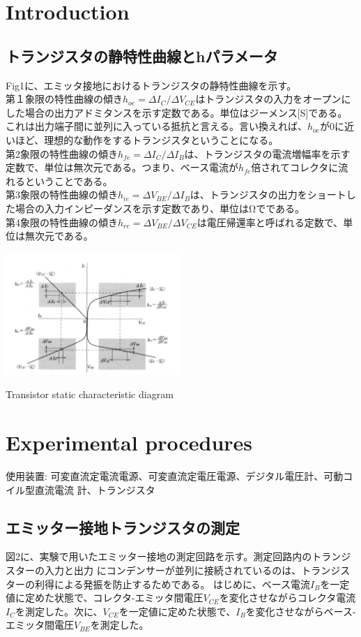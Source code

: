 \documentclass[a4paper,10pt]{jsarticle}
\makeatletter
\newenvironment{figurehere}
{\def\@captype{figure}}
{}
\makeatother
\begin{document}
\begin{multicols}{2}
\section{\textrm{Introduction}}
\subsection{トランジスタの静特性曲線とhパラメータ}
Fig1に、エミッタ接地におけるトランジスタの静特性曲線を示す。\\
第１象限の特性曲線の傾き$h_{oe}=\Delta I_C/\Delta V_{CE}$はトランジスタの入力をオープンにした場合の出力アドミタンスを示す定数である。単位はジーメンス[S]である。これは出力端子間に並列に入っている抵抗と言える。言い換えれば、$h_{oe}$が0に近いほど、理想的な動作をするトランジスタということになる。\\
第2象限の特性曲線の傾き$h_{fe}=\Delta I_C/\Delta I_B$は、トランジスタの電流増幅率を示す定数で、単位は無次元である。つまり、ベース電流が$h_{fe}$倍されてコレクタに流れるということである。\\
第3象限の特性曲線の傾き$h_{ie}=\Delta V_{BE}/\Delta I_B$は、トランジスタの出力をショートした場合の入力インピーダンスを示す定数であり、単位はΩでである。\\
第4象限の特性曲線の傾き$h_{re}=\Delta V_{BE}/\Delta V_{CE}$は電圧帰還率と呼ばれる定数で、単位は無次元である。

\begin{figurehere}
  \centering
  \includegraphics[width=0.5\textwidth]{figs/transistorCharacteristic.pdf}
  \caption{Transistor static characteristic diagram}
  \label{fig:my_label}
\end{figurehere}

\section{\textrm{Experimental procedures}}
使用装置:
可変直流定電流電源、可変直流定電圧電源、デジタル電圧計、可動コイル型直流電流 計、トランジスタ
\subsection{エミッター接地トランジスタの測定}
図2に、実験で用いたエミッター接地の測定回路を示す。測定回路内のトランジスターの入力と出力 にコンデンサーが並列に接続されているのは、トランジスターの利得による発振を防止するためである。
はじめに、ベース電流$I_B$を一定値に定めた状態で、コレクタ-エミッタ間電圧$V_{CE}$を変化させながらコレクタ電流$I_C$を測定した。次に、$V_{CE}$を一定値に定めた状態で、$I_B$を変化させながらベース-エミッタ間電圧$V_{BE}$を測定した。


\end{multicols}
\end{document}
